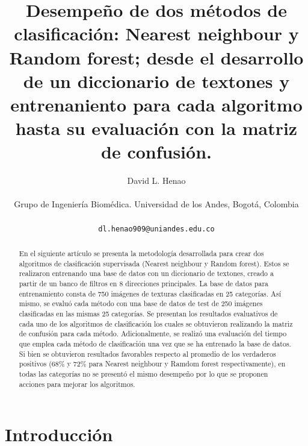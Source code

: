 \documentclass[10pt,twocolumn,letterpaper]{article}
\begin{document}
\title{Desempeño de dos métodos de clasificación: Nearest neighbour y Random forest; desde el desarrollo de un diccionario de textones y entrenaniento para cada algoritmo hasta su evaluación con la matriz de confusión.}

\author{David L. Henao\\
\begin{normalsize}
Grupo de Ingeniería Biomédica. Universidad de los Andes, Bogotá, Colombia
\end{normalsize}
\\
{\tt\small dl.henao909@uniandes.edu.co}}
\maketitle

\begin{abstract}

En el siguiente artículo se presenta la metodología desarrollada para crear dos algoritmos de clasificación supervisada (Nearest neighbour y Random forest). Estos se realizaron entrenando una base de datos con un diccionario de textones, creado a partir de un banco de filtros en 8 direcciones principales. La base de datos para entrenamiento consta de 750 imágenes de texturas clasificadas en 25 categorías. Así mismo, se evaluó cada método con una base de datos de test de 250 imágenes clasificadas en las mismas 25 categorías. Se presentan los resultados evaluativos de cada uno de los algoritmos de clasificación los cuales se obtuvieron realizando la matriz de confusión para cada método. Adicionalmente, se realizó una evaluación del tiempo que emplea cada método de clasificación una vez que se ha entrenado la base de datos. Si bien se obtuvieron resultados favorables respecto al promedio de los verdaderos positivos (68\% y 72\% para Nearest neighbour y Ramdom forest respectivamente), en todas las categorías no se presentó el mismo desempeño por lo que se proponen acciones para mejorar los algoritmos.
   
\end{abstract}

\section{Introducción}
\end{document}
